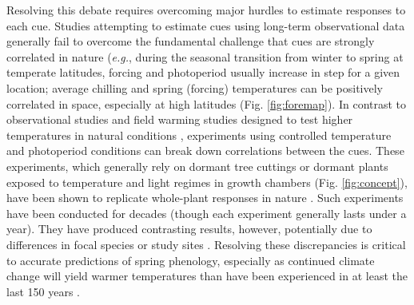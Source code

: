 \documentclass{article}
\newcommand{\R}[1]{\label{#1}\linelabel{#1}}
\begin{document}
\par Resolving this debate requires overcoming major hurdles to estimate responses to each cue. Studies attempting to estimate cues using long-term observational data \emph{\citep[e.g.,][]{zohner2016,vitasse2013}} generally fail to overcome the fundamental challenge that cues are strongly correlated in nature (\emph{e.g.}, during the seasonal transition from winter to spring at temperate latitudes, forcing and photoperiod usually increase in step for a given location; average chilling and spring (forcing) temperatures can be positively correlated in space, especially at high latitudes (Fig. \ref{fig:foremap}). In contrast to observational studies and field warming studies designed to test higher temperatures in natural conditions \emph{\citep{Wolkovich:2012n}},  \R{ee2start}experiments using controlled temperature and photoperiod conditions\R{ee2end} can break down correlations between the cues. These experiments, which generally rely on dormant tree cuttings or dormant plants exposed to temperature and light regimes in growth chambers (Fig. \ref{fig:concept}), have been shown to replicate whole-plant responses in nature \emph{\citep{vitasse2014}}. Such experiments have been conducted for decades (though each experiment generally lasts under a year). They have produced contrasting results, however, potentially due to differences in focal species or study sites \emph{\citep{zohner2016,Caffarra:2011b,Laube:2014a,Basler:2012,Caffarra:2011a}}. Resolving these discrepancies is critical to accurate predictions of spring phenology, especially as continued climate change will yield warmer temperatures than have been experienced in at least the last 150 years \emph{\citep{ohlemuller2006,williams2007,williams2007b,ipcc2013,xu2018}}.

\end{document}
